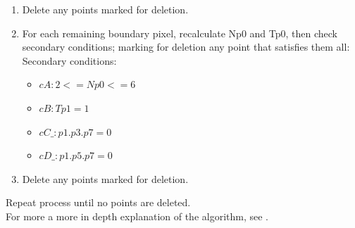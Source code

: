 \documentclass[a4paper, 12pt]{article}
\begin{document}
\begin{enumerate}
        \item Delete any points marked for deletion.
        \item For each remaining boundary pixel, recalculate Np0 and Tp0, then check secondary conditions; marking for deletion any point that satisfies them all:\\
Secondary conditions:
        \begin{itemize}
        \item $cA:     2 <= Np0 <= 6$
        \item $cB:     Tp1 = 1$
        \item $cC\_:    p1 . p3 . p7 = 0$
        \item $cD\_:    p1 . p5 . p7 = 0$
        \end{itemize}
        \item Delete any points marked for deletion.
        \end{enumerate}
%
Repeat process until no points are deleted.\\
For more a more in depth explanation of the algorithm, see \cite{skeletonisation}.
       
\end{document}

